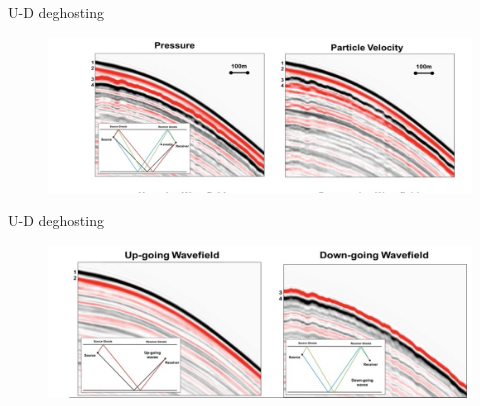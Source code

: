 \documentclass[xcolor=dvipsnames,notes]{beamer}
\begin{document}
\begin{frame}{U-D deghosting}
\begin{figure}
    \includegraphics[width=1.0\textwidth]{Fig/ghost2.png}
\end{figure}
\end{frame}
\begin{frame}{U-D deghosting}
\begin{figure}
    \includegraphics[width=1.0\textwidth]{Fig/ghost3.png}
\end{figure}
\end{frame}
\end{document}
